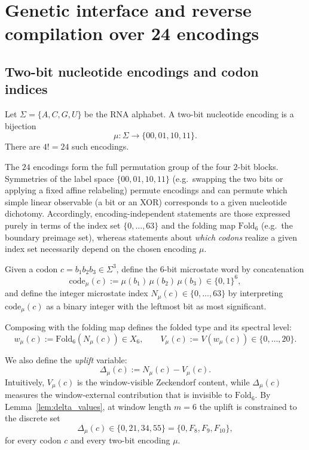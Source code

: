 \section{Genetic interface and reverse compilation over 24 encodings}
\label{sec:reverse_compilation}

\subsection{Two-bit nucleotide encodings and codon indices}
\label{sec:encoding}

Let $\Sigma=\{A,C,G,U\}$ be the RNA alphabet.
A two-bit nucleotide encoding is a bijection
\[
\mu:\Sigma\to\{00,01,10,11\}.
\]
There are $4!=24$ such encodings.

\begin{remark}
The $24$ encodings form the full permutation group of the four $2$-bit blocks.
Symmetries of the label space $\{00,01,10,11\}$ (e.g.\ swapping the two bits or applying a fixed affine relabeling) permute encodings and can permute which simple linear observable (a bit or an XOR) corresponds to a given nucleotide dichotomy.
Accordingly, encoding-independent statements are those expressed purely in terms of the index set $\{0,\dots,63\}$ and the folding map $\mathrm{Fold}_6$ (e.g.\ the boundary preimage set), whereas statements about \emph{which codons} realize a given index set necessarily depend on the chosen encoding $\mu$.
\end{remark}

Given a codon $c=b_1 b_2 b_3\in\Sigma^3$, define the $6$-bit microstate word by concatenation
\[
\mathrm{code}_\mu(c):=\mu(b_1)\,\mu(b_2)\,\mu(b_3)\in\{0,1\}^6,
\]
and define the integer microstate index $N_\mu(c)\in\{0,\dots,63\}$ by interpreting $\mathrm{code}_\mu(c)$ as a binary integer with the leftmost bit as most significant.

Composing with the folding map defines the folded type and its spectral level:
\[
w_\mu(c):=\mathrm{Fold}_6(N_\mu(c))\in X_6,\qquad
V_\mu(c):=V(w_\mu(c))\in\{0,\dots,20\}.
\]

We also define the \emph{uplift} variable:
\[
\Delta_\mu(c):=N_\mu(c)-V_\mu(c).
\]
Intuitively, $V_\mu(c)$ is the window-visible Zeckendorf content, while $\Delta_\mu(c)$ measures the window-external contribution that is invisible to $\mathrm{Fold}_6$.
By Lemma~\ref{lem:delta_values}, at window length $m=6$ the uplift is constrained to the discrete set
\[
\Delta_\mu(c)\in\{0,21,34,55\}=\{0,F_8,F_9,F_{10}\},
\]
for every codon $c$ and every two-bit encoding $\mu$.

